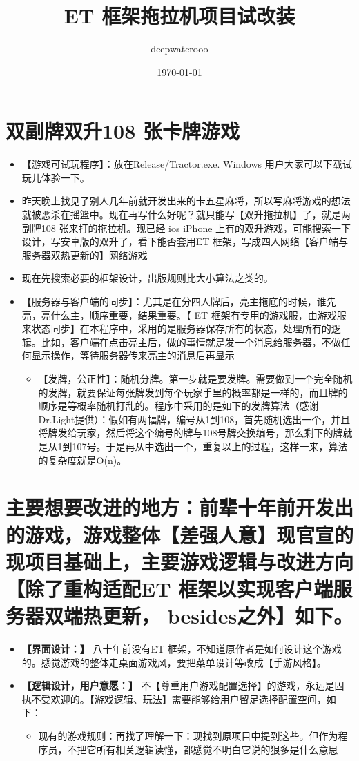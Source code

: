 \documentclass[9pt, b5paper]{article}
\author{deepwaterooo}
\date{\today}
\title{ET 框架拖拉机项目试改装}
\begin{document}
\maketitle
\tableofcontents


\section{双副牌双升108 张卡牌游戏}
\label{sec-1}
\begin{itemize}
\item 【游戏可试玩程序】：放在Release/Tractor.exe. Windows 用户大家可以下载试玩儿体验一下。
\item 昨天晚上找见了别人几年前就开发出来的卡五星麻将，所以写麻将游戏的想法就被恶杀在摇篮中。现在再写什么好呢？就只能写【双升拖拉机】了，就是两副牌108 张来打的拖拉机。现已经 ios iPhone 上有的双升游戏，可能搜索一下设计，写安卓版的双升了，看下能否套用ET 框架，写成四人网络【客户端与服务器双热更新的】网络游戏
\item 现在先搜索必要的框架设计，出版规则比大小算法之类的。
\item 【服务器与客户端的同步】：尤其是在分四人牌后，亮主拖底的时候，谁先亮，亮什么主，顺序重要，结果重要。【 ET 框架有专用的游戏服，由游戏服来状态同步】在本程序中，采用的是服务器保存所有的状态，处理所有的逻辑。比如，客户端在点击亮主后，做的事情就是发一个消息给服务器，不做任何显示操作，等待服务器传来亮主的消息后再显示
\begin{itemize}
\item 【发牌，公正性】：随机分牌。第一步就是要发牌。需要做到一个完全随机的发牌，就要保证每张牌发到每个玩家手里的概率都是一样的，而且牌的顺序是等概率随机打乱的。程序中采用的是如下的发牌算法（感谢Dr.Light提供）：假如有两幅牌，编号从1到108，首先随机选出一个，并且将牌发给玩家，然后将这个编号的牌与108号牌交换编号，那么剩下的牌就是从1到107号。于是再从中选出一个，重复以上的过程，这样一来，算法的复杂度就是O(n)。
\end{itemize}
\end{itemize}
\section{主要想要改进的地方：前辈十年前开发出的游戏，游戏整体【差强人意】现官宣的现项目基础上，主要游戏逻辑与改进方向【除了重构适配ET 框架以实现客户端服务器双端热更新， besides之外】如下。}
\label{sec-2}
\begin{itemize}
\item \textbf{【界面设计：】} 八十年前没有ET 框架，不知道原作者是如何设计这个游戏的。感觉游戏的整体走桌面游戏风，要把菜单设计等改成【手游风格】。
\item \textbf{【逻辑设计，用户意愿：】} 不【尊重用户游戏配置选择】的游戏，永远是固执不受欢迎的。【游戏逻辑、玩法】需要能够给用户留足选择配置空间，如下：
\begin{itemize}
\item 现有的游戏规则：再找了理解一下：现找到原项目中提到这些。但作为程序员，不把它所有相关逻辑读懂，都感觉不明白它说的狠多是什么意思
\end{itemize}
\end{itemize}
\end{document}
